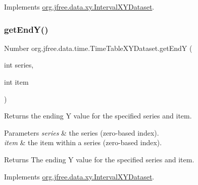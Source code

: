 Implements \mbox{\hyperlink{interfaceorg_1_1jfree_1_1data_1_1xy_1_1_interval_x_y_dataset_ad976e66caa1fc4d72a599f2c26c55dcc}{org.\+jfree.\+data.\+xy.\+Interval\+X\+Y\+Dataset}}.

\mbox{\label{classorg_1_1jfree_1_1data_1_1time_1_1_time_table_x_y_dataset_aa5852bdf77d8d13d5b5a0ef5c8e138e7}} 
\subsubsection{\texorpdfstring{get\+End\+Y()}{getEndY()}}
{\footnotesize\ttfamily Number org.\+jfree.\+data.\+time.\+Time\+Table\+X\+Y\+Dataset.\+get\+EndY (\begin{DoxyParamCaption}\item[{int}]{series,  }\item[{int}]{item }\end{DoxyParamCaption})}

Returns the ending Y value for the specified series and item.


\begin{DoxyParams}{Parameters}
{\em series} & the series (zero-\/based index). \\
\hline
{\em item} & the item within a series (zero-\/based index).\\
\hline
\end{DoxyParams}
\begin{DoxyReturn}{Returns}
The ending Y value for the specified series and item. 
\end{DoxyReturn}


Implements \mbox{\hyperlink{interfaceorg_1_1jfree_1_1data_1_1xy_1_1_interval_x_y_dataset_ae938af574bad07e7f47a8b423223ef9b}{org.\+jfree.\+data.\+xy.\+Interval\+X\+Y\+Dataset}}.

\mbox{\label{classorg_1_1jfree_1_1data_1_1time_1_1_time_table_x_y_dataset_ad80a7fca84f962b49d80b1c1f4f745a4}} 

